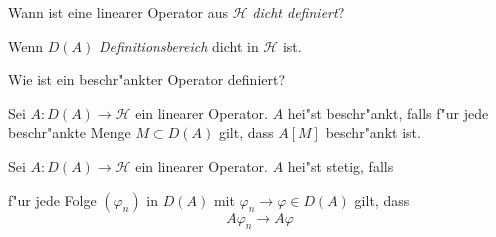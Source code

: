 \documentclass[9pt]{article}
\newcommand{\Hi}{\mathcal{H}}
\newenvironment{field}{}{\newpage}
\newif\ifnote
\newenvironment{note}{\notetrue}{\notefalse}
\newcommand{\localtag}{}
\newcommand{\globaltag}{}
\newcommand{\uuid}{}
\newcommand{\tags}[1]{
    \ifnote 
        \renewcommand{\localtag}{#1}
    \else
        \renewcommand{\globaltag}{#1}
    \fi 
    }
\newcommand{\xplain}[1]{\renewcommand{\uuid}{#1}}
\begin{document}

\tags{mathe2::2sem::hilbertraum, beschrankte-lineare-operatoren}

\begin{note}
	\xplain{UUID}
	\tags{}
	
	\begin{field}  %
		Wann ist eine linearer Operator aus $\Hi$ \textit{dicht definiert}?
	\end{field}
	
	\begin{field}  %
		Wenn $D(A)$ \textit{Definitionsbereich} dicht in $\Hi$ ist.
	\end{field}
\end{note}
	\begin{note}
		\xplain{UUID}
		\tags{6.1.3}
		
		\begin{field}  %
			Wie ist ein beschr"ankter Operator definiert?	
		\end{field}
		
		\begin{field}  %
			Sei $A: D(A) \rightarrow \Hi$ ein linearer Operator. $A$ hei"st beschr"ankt, falls
			f"ur jede beschr"ankte Menge $M\subset D(A)$ gilt, dass $A[M]$ beschr"ankt ist.
		\end{field}
		
			
		\begin{field}  %
			Sei $A: D(A) \rightarrow \Hi$ ein linearer Operator. $A$ hei"st stetig, falls
		\end{field}
		
		\begin{field}  %
			f"ur jede Folge $(\varphi_n)$ in $D(A)$ mit $\varphi_n \rightarrow \varphi \in D(A)$ gilt, dass
			\begin{equation*}
				A\varphi_n \rightarrow A\varphi
			\end{equation*}
		\end{field}
	\end{note}
\end{document}
